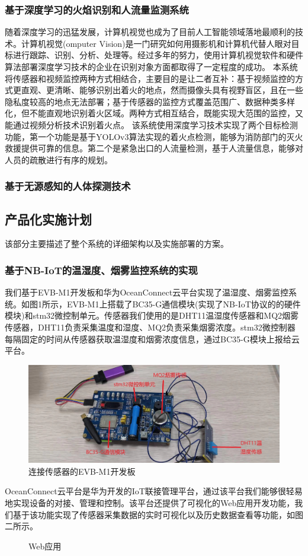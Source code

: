 \documentclass{ctexart}
\begin{document}
	\subsubsection{基于深度学习的火焰识别和人流量监测系统}
	随着深度学习的迅猛发展，计算机视觉也成为了目前人工智能领域落地最顺利的技术。计算机视觉(omputer  Vision)是一门研究如何用摄影机和计算机代替人眼对目标进行跟踪、识别、分析、处理等。经过多年的努力，使用计算机视觉软件和硬件算法部署深度学习技术的企业在识别对象方面都取得了一定程度的成功。
	本系统将传感器和视频监控两种方式相结合，主要目的是让二者互补：基于视频监控的方式更直观、更清晰、能够识别出着火的地点，然而摄像头具有视野盲区，且在一些隐私度较高的地点无法部署；基于传感器的监控方式覆盖范围广、数据种类多样化，但不能直观地识别着火区域。两种方式相互结合，既能实现大范围的监控，又能通过视频分析技术识别着火点。
	该系统使用深度学习技术实现了两个目标检测功能，第一个功能是基于YOLOv3算法实现的着火点检测，能够为消防部门的灭火救援提供可靠的信息。第二个是紧急出口的人流量检测，基于人流量信息，能够对人员的疏散进行有序的规划。
	\subsubsection{基于无源感知的人体探测技术}
	\subsection{产品化实施计划}
	该部分主要描述了整个系统的详细架构以及实施部署的方案。
	\subsubsection{基于NB-IoT的温湿度、烟雾监控系统的实现}
	我们基于EVB-M1开发板和华为OceanConnect云平台实现了温湿度、烟雾监控系统。如图1所示，EVB-M1上搭载了BC35-G通信模块(实现了NB-IoT协议的的硬件模块)和stm32微控制单元。传感器我们使用的是DHT11温湿度传感器和MQ2烟雾传感器，DHT11负责采集温度和湿度、MQ2负责采集烟雾浓度。stm32微控制器每隔固定的时间从传感器获取温湿度和烟雾浓度信息，通过BC35-G模块上报给云平台。\par
	\begin{figure}
		\centering
		\includegraphics[scale=0.2]{1.jpg}
		\caption{连接传感器的EVB-M1开发板}
		\label{图1}
	\end{figure}
	OceanConnect云平台是华为开发的IoT联接管理平台，通过该平台我们能够很轻易地实现设备的对接、管理和控制。该平台还提供了可视化的Web应用开发功能，我们基于该功能实现了传感器采集数据的实时可视化以及历史数据查看等功能，如图二所示。
	\begin{figure}
		\centering
		\caption{Web应用}
		\label{Web Application}
	\end{figure}
\end{document}
